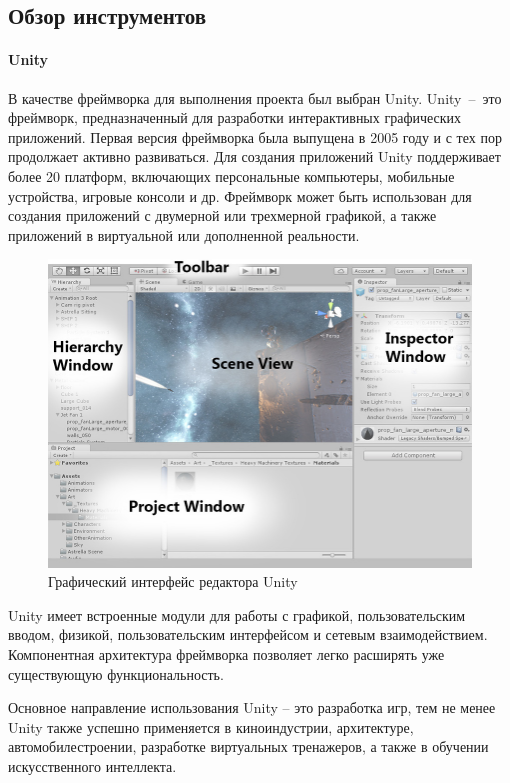 ﻿\subsection{Обзор инструментов}

\paragraph{Unity}

В качестве фреймворка для выполнения проекта был выбран Unity.
Unity~--~это фреймворк, предназначенный для разработки интерактивных графических приложений.%
\cite{DocUnity}
Первая версия фреймворка была выпущена в 2005 году
и с тех пор продолжает активно развиваться.
Для создания приложений Unity поддерживает более 20 платформ,
включающих персональные компьютеры, мобильные устройства, игровые консоли и др.
Фреймворк может быть использован для создания приложений
с двумерной или трехмерной графикой, а также приложений
в виртуальной или дополненной реальности.

\begin{figure}[h]
    \includegraphics[width=\textwidth]{images/Editor-Breakdown.jpg}
    \caption{Графический интерфейс редактора Unity}
    \label{figure:UnityInterface}
\end{figure}

Unity имеет встроенные модули для работы с
графикой, пользовательским вводом, физикой,
пользовательским интерфейсом и сетевым взаимодействием.
Компонентная архитектура фреймворка позволяет
легко расширять уже существующую функциональность.

Основное направление использования Unity -- это разработка игр,
тем не менее Unity также успешно применяется в киноиндустрии,\cite{UnityInFilmmaking}
архитектуре, автомобилестроении,\cite{UnityInAutomotive}
разработке виртуальных тренажеров, а также в
обучении искусственного интеллекта.\cite{UnityInAI}

